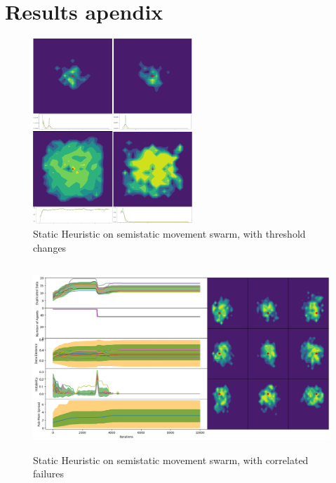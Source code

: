 \documentclass{UoYCSproject}
\begin{document}

\chapter{Results apendix}

\begin{figure}[htb]
\label{fig:Threshold_Changes}
\begin{center}
\centering
\includegraphics[height=7cm]{"./Static_Heuristic/Threshold_Changes.png"}
\caption{Static Heuristic on semi\-static movement swarm, with threshold changes}
\end{center}
\end{figure}

\begin{figure}[htb]
\label{fig:static_movement_con}
\begin{center}
\centering
\includegraphics[height=7cm]{"./Static_Heuristic/Static_Movement_concurrent.png"}
\caption{Static Heuristic on semi\-static movement swarm, with correlated failures}
\end{center}
\end{figure}
\end{document}
